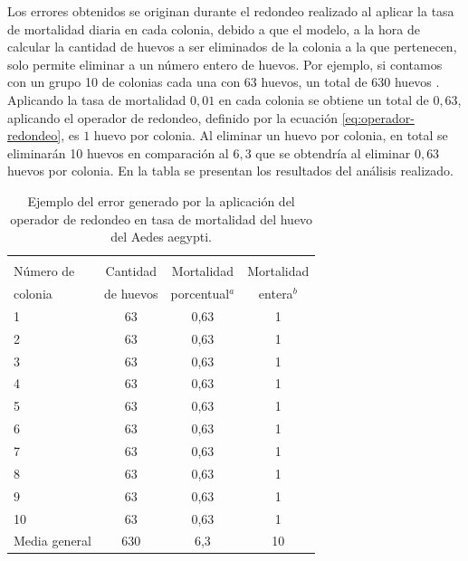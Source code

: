 Los errores obtenidos se originan durante el redondeo realizado al aplicar la tasa de mortalidad
diaria en cada colonia, debido a que el modelo, a la hora de calcular la cantidad de huevos a ser
eliminados de la colonia a la que pertenecen, solo permite eliminar a un número entero de huevos.
Por ejemplo, si contamos con un grupo 10 de colonias cada una con 63 huevos, un total de 630 huevos
. Aplicando la tasa de mortalidad $0,01$ en cada colonia se obtiene un total de $0,63$, aplicando
el operador de redondeo, definido por la ecuación \eqref{eq:operador-redondeo}, es $1$ huevo por
colonia. Al eliminar un huevo por colonia, en total se eliminarán 10 huevos en comparación al $6,3$
 que se obtendría al eliminar $0,63$ huevos por colonia. En la tabla
  se presentan los resultados del análisis realizado.

\begin{table}
    \begin{minipage}{\textwidth}
        \centering
        \caption{ \label{tab:mortalidad-huevo-error} Ejemplo del error generado por la aplicación
        del operador de redondeo en tasa de mortalidad del huevo del Aedes aegypti.}
        \begin{tabular}{l c c c }
                    \hline \\
                    Número de & Cantidad  & Mortalidad      & Mortalidad \\
                    colonia   & de huevos & porcentual$^{a}$ & entera$^{b}$\\
                    \hline
                    \hline
                    1       & 63  & 0,63 & 1\\
                    2       & 63  & 0,63 & 1\\
                    3       & 63  & 0,63 & 1\\
                    4       & 63  & 0,63 & 1\\
                    5       & 63  & 0,63 & 1\\
                    6       & 63  & 0,63 & 1\\
                    7       & 63  & 0,63 & 1\\
                    8       & 63  & 0,63 & 1\\
                    9       & 63  & 0,63 & 1\\
                    10      & 63  & 0,63 & 1\\
                    Media general  & 630 & 6,3 & 10\\

        \end{tabular}
    \end{minipage}
\end{table}
